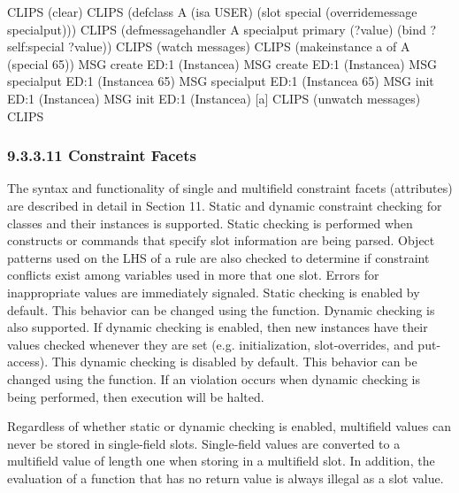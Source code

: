 \documentclass[letterpaper,10pt,english]{sphinxmanual}
\begin{document}
\begin{sphinxVerbatim}[commandchars=\\\{\}]
CLIPS\PYGZgt{} (clear)
CLIPS\PYGZgt{}
(defclass A (is\PYGZhy{}a USER)
  (slot special (override\PYGZhy{}message special\PYGZhy{}put)))
CLIPS\PYGZgt{}
(defmessage\PYGZhy{}handler A special\PYGZhy{}put primary (?value)
  (bind ?self:special ?value))
CLIPS\PYGZgt{} (watch messages)
CLIPS\PYGZgt{} (make\PYGZhy{}instance a of A (special 65))
MSG \PYGZgt{}\PYGZgt{} create ED:1 (\PYGZlt{}Instance\PYGZhy{}a\PYGZgt{})
MSG \PYGZlt{}\PYGZlt{} create ED:1 (\PYGZlt{}Instance\PYGZhy{}a\PYGZgt{})
MSG \PYGZgt{}\PYGZgt{} special\PYGZhy{}put ED:1 (\PYGZlt{}Instance\PYGZhy{}a\PYGZgt{} 65)
MSG \PYGZlt{}\PYGZlt{} special\PYGZhy{}put ED:1 (\PYGZlt{}Instance\PYGZhy{}a\PYGZgt{} 65)
MSG \PYGZgt{}\PYGZgt{} init ED:1 (\PYGZlt{}Instance\PYGZhy{}a\PYGZgt{})
MSG \PYGZlt{}\PYGZlt{} init ED:1 (\PYGZlt{}Instance\PYGZhy{}a\PYGZgt{})
[a]
CLIPS\PYGZgt{} (unwatch messages)
CLIPS\PYGZgt{}
\end{sphinxVerbatim}


\subsubsection{9.3.3.11 Constraint Facets}
\label{\detokenize{cool:constraint-facets}}
The syntax and functionality of single and multifield constraint facets
(attributes) are described in detail in Section 11. Static and dynamic
constraint checking for classes and their instances is supported. Static
checking is performed when constructs or commands that specify slot
information are being parsed. Object patterns used on the LHS of a rule
are also checked to determine if constraint conflicts exist among
variables used in more that one slot. Errors for inappropriate values
are immediately signaled. Static checking is enabled by default. This
behavior can be changed using the 
function. Dynamic checking is also supported. If dynamic checking is
enabled, then new instances have their values checked whenever they are
set (e.g. initialization, slot-overrides, and put- access). This dynamic
checking is disabled by default. This behavior can be changed using the
 function. If an violation occurs
when dynamic checking is being performed, then execution will be halted.

Regardless of whether static or dynamic checking is enabled, multifield
values can never be stored in single-field slots. Single-field values
are converted to a multifield value of length one when storing in a
multifield slot. In addition, the evaluation of a function that has no
return value is always illegal as a slot value.
\end{document}
